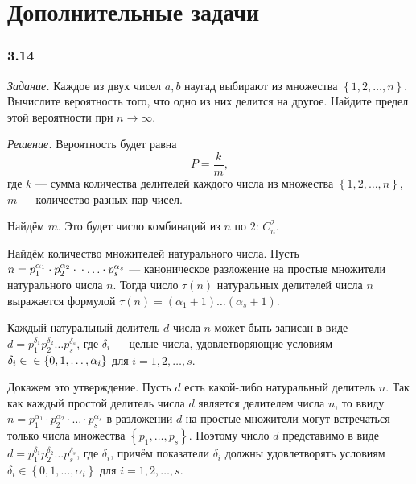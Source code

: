\section*{Дополнительные задачи}

\subsubsection*{3.14}

\textit{Задание.} Каждое из двух чисел $a, b$ наугад выбирают из множества $ \left\{ 1, 2, \dotsc, n \right\}$.
Вычислите вероятность того, что одно из них делится на другое.
Найдите предел этой вероятности при $n \rightarrow \infty$.

\textit{Решение.} Вероятность будет равна
$$P =
\frac{k}{m},$$
где $k$ --- сумма количества делителей каждого числа из множества  $ \left\{ 1, 2, \dotsc, n \right\}$, $m$ --- количество разных пар чисел.

Найдём $m$.
Это будет число комбинаций из $n$ по $2$: $C_n^2$.

Найдём количество множителей натурального числа.
Пусть
$n =
p_1^{ \alpha_1} \cdot p_2^{ \alpha_2} \cdot \\
\cdot \dotsc \cdot p_s^{ \alpha_s}$
--- каноническое разложение на простые множители натурального числа $n$.
Тогда число $ \tau \left( n \right) $ натуральных делителей числа $n$ выражается формулой
$ \tau \left( n \right) =
\left( \alpha_1 + 1 \right) \dotsc \left( \alpha_s + 1 \right)$.

Каждый натуральный делитель $d$ числа $n$
может быть записан в виде
$d = p_1^{ \delta_1} p_2^{ \delta_2} \dotsc p_s^{ \delta_s}$, где $ \delta_i$ ---
целые числа, удовлетворяющие условиям
$ \delta_i \in  \\
\in \left\{ 0, 1, \dotsc, \alpha_i \right\}$
для $i = 1, 2, \dotsc, s$.

Докажем это утверждение.
Пусть $d$ есть какой-либо натуральный делитель $n$.
Так как каждый простой делитель числа $d$
является делителем числа $n$, то ввиду
$n =
p_1^{ \alpha_1} \cdot p_2^{ \alpha_2} \cdot \dotsc \cdot p_s^{ \alpha_s}$
в разложении $d$ на простые множители могут встречаться только числа множества $ \left\{ p_1, \dotsc, p_s \right\}$.
Поэтому число $d$ представимо в виде $d = p_1^{ \delta_1} p_2^{ \delta_2} \dotsc p_s^{ \delta_s}$, где $ \delta_i$,
причём показатели $ \delta_i$ должны удовлетворять условиям
$ \delta_i \in \left\{ 0, 1, \dotsc, \alpha_i \right\}$ для $i = 1, 2, \dotsc, s$.

